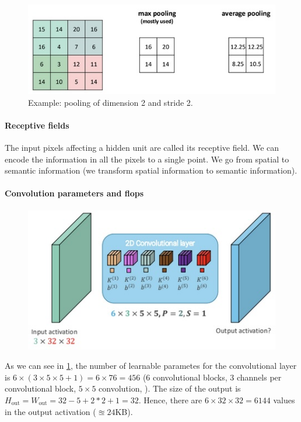 \documentclass{article}
\begin{document}
\begin{figure}[htbp]
  \centering
  \includegraphics[width=0.8\linewidth]{./img/pooling.jpg}
  \caption{Example: pooling of dimension 2 and stride 2.}
\end{figure}

\paragraph{Receptive fields}
The input pixels affecting a hidden unit are called its receptive field.
We can encode the information in all the pixels to a single point.
We go from spatial to semantic information (we transform spatial information to semantic information).

\paragraph{Convolution parameters and flops}

\begin{figure}[htbp]
  \centering
  \includegraphics[width=0.8\linewidth]{./img/convolutions_flops.jpg}
  \caption{}
  \label{fig:convolutions_flops}
\end{figure}

As we can see in \ref{fig:convolutions_flops}, the number of learnable parametes for the convolutional layer is $6 \times (3 \times 5 \times 5 + 1) = 6 \times 76 = 456$ (6 convolutional blocks, 3 channels per convolutional block, $5 \times 5$ convolution, ).
The size of the output is $H_\text{{out}} = W_\text{{out}} = 32 - 5 + 2 * 2 + 1 = 32$.
Hence, there are $6 \times 32 \times 32 = 6144$ values in the output activation ($\approxeq 24$KB).
\end{document}
